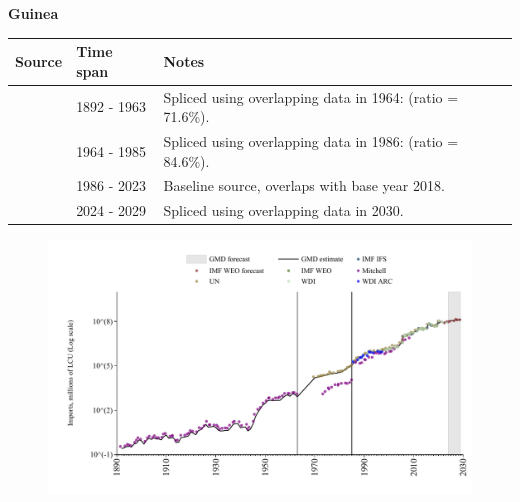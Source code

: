 \documentclass[12pt,a4paper,landscape]{article}
\begin{document}
\begin{adjustbox}{max totalsize={\paperwidth}{\paperheight},center}
\begin{minipage}[t][\textheight][t]{\textwidth}
\vspace*{0.5cm}
{}
\begin{center}
{\Large\bfseries Guinea}
\end{center}
\vspace{0.5cm}
\begin{table}[H]
\centering
\small
\begin{tabular}{|l|l|l|}
\hline
\textbf{Source} & \textbf{Time span} & \textbf{Notes} \\
\hline
\rowcolor{white}\cite{Mitchell}& 1892 - 1963 &Spliced using overlapping data in 1964: (ratio = 71.6\%).\\
\rowcolor{lightgray}\cite{UN}& 1964 - 1985 &Spliced using overlapping data in 1986: (ratio = 84.6\%).\\
\rowcolor{white}\cite{WDI}& 1986 - 2023 &Baseline source, overlaps with base year 2018.\\
\rowcolor{lightgray}\cite{IMF_WEO_forecast}& 2024 - 2029 &Spliced using overlapping data in 2030.\\
\hline
\end{tabular}
\end{table}
\begin{figure}[H]
\centering
\includegraphics[width=\textwidth,height=0.6\textheight,keepaspectratio]{graphs/GIN_imports.pdf}
\end{figure}
\end{minipage}
\end{adjustbox}
\end{document}
